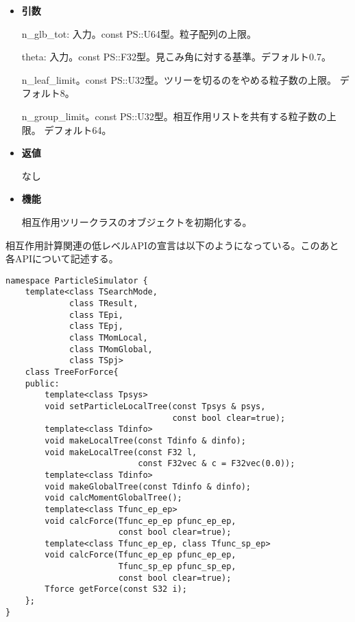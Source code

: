 \begin{itemize}

\item {\bf 引数}

n\_glb\_tot: 入力。const PS::U64型。粒子配列の上限。

theta: 入力。const PS::F32型。見こみ角に対する基準。デフォルト0.7。

n\_leaf\_limit。const PS::U32型。ツリーを切るのをやめる粒子数の上限。
デフォルト8。

n\_group\_limit。const PS::U32型。相互作用リストを共有する粒子数の上限。
デフォルト64。

\item {\bf 返値}

なし

\item {\bf 機能}

相互作用ツリークラスのオブジェクトを初期化する。

\end{itemize}


相互作用計算関連の低レベルAPIの宣言は以下のようになっている。このあと
各APIについて記述する。
\begin{lstlisting}[caption=TreeForForce1]
namespace ParticleSimulator {
    template<class TSearchMode,
             class TResult,
             class TEpi,
             class TEpj,
             class TMomLocal,
             class TMomGlobal,
             class TSpj>
    class TreeForForce{
    public:
        template<class Tpsys>
        void setParticleLocalTree(const Tpsys & psys,
                                  const bool clear=true);
        template<class Tdinfo>
        void makeLocalTree(const Tdinfo & dinfo);
        void makeLocalTree(const F32 l,
                           const F32vec & c = F32vec(0.0));
        template<class Tdinfo>
        void makeGlobalTree(const Tdinfo & dinfo);        
        void calcMomentGlobalTree();
        template<class Tfunc_ep_ep>
        void calcForce(Tfunc_ep_ep pfunc_ep_ep,
                       const bool clear=true);  
        template<class Tfunc_ep_ep, class Tfunc_sp_ep>
        void calcForce(Tfunc_ep_ep pfunc_ep_ep,
                       Tfunc_sp_ep pfunc_sp_ep,
                       const bool clear=true);
        Tforce getForce(const S32 i);
    };
}
\end{lstlisting}


